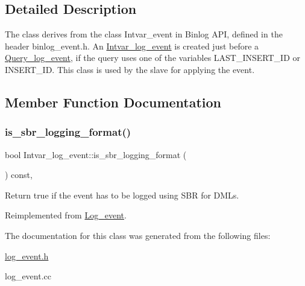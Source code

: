 \subsection{Detailed Description}
The class derives from the class Intvar\+\_\+event in Binlog A\+PI, defined in the header binlog\+\_\+event.\+h. An \mbox{\hyperlink{classIntvar__log__event}{Intvar\+\_\+log\+\_\+event}} is created just before a \mbox{\hyperlink{classQuery__log__event}{Query\+\_\+log\+\_\+event}}, if the query uses one of the variables L\+A\+S\+T\+\_\+\+I\+N\+S\+E\+R\+T\+\_\+\+ID or I\+N\+S\+E\+R\+T\+\_\+\+ID. This class is used by the slave for applying the event. 

\subsection{Member Function Documentation}
\mbox{\label{classIntvar__log__event_adb0ffc05f019430b9d33c4742f92819f}} 
\subsubsection{\texorpdfstring{is\+\_\+sbr\+\_\+logging\+\_\+format()}{is\_sbr\_logging\_format()}}
{\footnotesize\ttfamily bool Intvar\+\_\+log\+\_\+event\+::is\+\_\+sbr\+\_\+logging\+\_\+format (\begin{DoxyParamCaption}{ }\end{DoxyParamCaption}) const\hspace{0.3cm}{\ttfamily [inline]}, {\ttfamily [virtual]}}

Return true if the event has to be logged using S\+BR for D\+M\+Ls. 

Reimplemented from \mbox{\hyperlink{classLog__event_ad4d689d007b7c8f1b0d54e65d8f34069}{Log\+\_\+event}}.



The documentation for this class was generated from the following files\+:\begin{DoxyCompactItemize}
\item 
\mbox{\hyperlink{log__event_8h}{log\+\_\+event.\+h}}\item 
log\+\_\+event.\+cc\end{DoxyCompactItemize}
